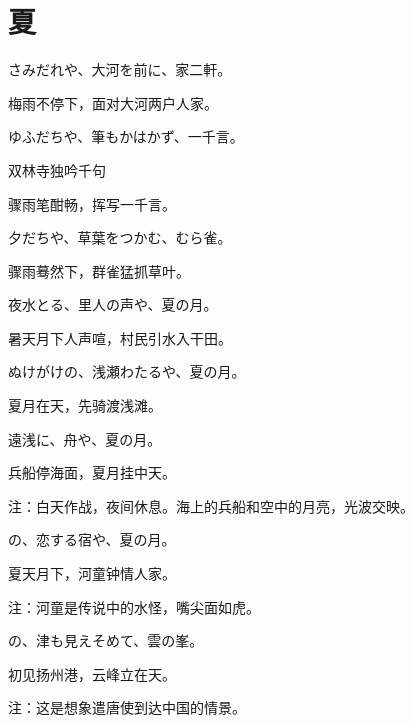 \section{\FK 夏}

\setcounter{haikucounter}{0}

\begin{haiku}
    {\FH さみだれや、大河を前に、家二軒。}

    {\FK 梅雨不停下，面对大河两户人家。}
\end{haiku}

\begin{haiku}
    {\FH ゆふだちや、筆もかはかず、一千言。}

    {\FK 双林寺独吟千句}

    {\FK 骤雨笔酣畅，挥写一千言。}
\end{haiku}

\begin{haiku}
    {\FH 夕だちや、草葉をつかむ、むら雀。}

    {\FK 骤雨蓦然下，群雀猛抓草叶。}
\end{haiku}

\begin{haiku}
    {\FH 夜水とる、里人の声や、夏の月。}

    {\FK 暑天月下人声喧，村民引水入干田。}
\end{haiku}

\begin{haiku}
    {\FH ぬけがけの、浅瀬わたるや、夏の月。}

    {\FK 夏月在天，先骑渡浅滩。}
\end{haiku}

\begin{haiku}
    {\FH 遠浅に、舟や、夏の月。}

    {\FK 兵船停海面，夏月挂中天。}

    {\FT 注：白天作战，夜间休息。海上的兵船和空中的月亮，光波交映。}
\end{haiku}

\begin{haiku}
    {\FH {}の、恋する宿や、夏の月。}

    {\FK 夏天月下，河童钟情人家。}

    {\FT 注：河童是传说中的水怪，嘴尖面如虎。}
\end{haiku}

\begin{haiku}
    {\FH {}の、津も見えそめて、雲の峯。}

    {\FK 初见扬州港，云峰立在天。}

    {\FT 注：这是想象遣唐使到达中国的情景。}
\end{haiku}

